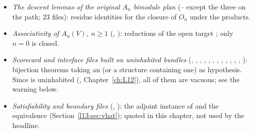 \begin{itemize}
  , , , ,
  , , ). Some of them (: ) prove true theorems quoted in this chapter
  that the headline simply does not need.
\item \emph{The descent lemmas of the original $A_n$ bimodule plan} (-- except the
  three on the path; $23$ files): residue identities for the closure of $O_n$ under the products.
\item \emph{Associativity of $A_n(V)$, $n\ge1$} (, ): reductions of the open target
  ; only $n = 0$ is closed.
\item \emph{Scorecard and interface files built on uninhabited bundles} (, ,
  , , , , ,
  , , , , ,
  ): bijection theorems taking an  (or a structure containing one) as hypothesis. Since
   is uninhabited (, Chapter~\ref{ch:L12}), all of them are vacuous;
  see the warning below.
\item \raggedright\emph{Satisfiability and boundary files} (, ): the adjoint
  instance of  and the equivalence 
  (Section~\ref{l13:sec:vhat}); quoted in this chapter, not used by the headline.
\end{itemize}

